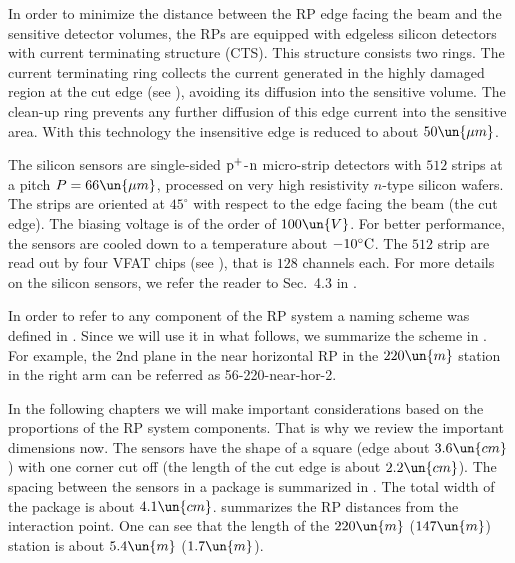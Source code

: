In order to minimize the distance between the RP edge facing the beam and the sensitive detector volumes, the RPs are equipped with edgeless silicon detectors with current terminating structure (CTS). This structure consists two rings. The current terminating ring collects the current generated in the highly damaged region at the cut edge (see ), avoiding its diffusion into the sensitive volume. The clean-up ring prevents any further diffusion of this edge current into the sensitive area. With this technology the insensitive edge is reduced to about $50\un{\mu m}$.

The silicon sensors are single-sided $\rm p^+$-$\rm n$ micro-strip detectors with $512$ strips at a pitch $P = 66\un{\mu m}$, processed on very high resistivity
$n$-type silicon wafers. The strips are oriented at $45^\circ$ with respect to the edge facing the beam (the cut edge). The biasing voltage is of the order of $100\un{V}$. For better performance, the sensors are cooled down to a temperature about $-10^\circ\rm C$. The $512$ strip are read out by four VFAT chips (see ), that is $128$ channels each. For more details on the silicon sensors, we refer the reader to Sec.~4.3 in .

In order to refer to any component of the RP system a naming scheme was defined in . Since we will use it in what follows, we summarize the scheme in . For example, the 2nd plane in the near horizontal RP in the $220\un{m}$ station in the right arm can be referred as 56-220-near-hor-2.


In the following chapters we will make important considerations based on the proportions of the RP system components. That is why we review the important dimensions now. The sensors have the shape of a square (edge about $3.6\un{cm}$) with one corner cut off (the length of the cut edge is about $2.2\un{cm}$). The spacing between the sensors in a package is summarized in . The total width of the package is about $4.1\un{cm}$.  summarizes the RP distances from the interaction point. One can see that the length of the $220\un{m}$ ($147\un{m}$) station is about $5.4\un{m}$ ($1.7\un{m}$).


